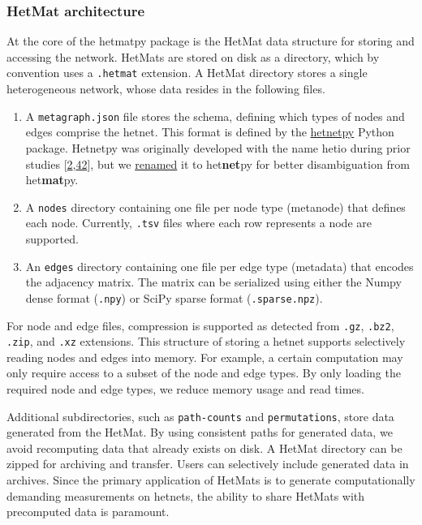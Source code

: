 \hypertarget{hetmat-architecture}{%
\subsubsection{HetMat architecture}\label{hetmat-architecture}}

At the core of the hetmatpy package is the HetMat data structure for storing and accessing the network.
HetMats are stored on disk as a directory, which by convention uses a \texttt{.hetmat} extension.
A HetMat directory stores a single heterogeneous network, whose data resides in the following files.

\begin{enumerate}
\def\labelenumi{\arabic{enumi}.}
\tightlist
\item
  A \texttt{metagraph.json} file stores the schema, defining which types of nodes and edges comprise the hetnet.
  This format is defined by the \href{https://github.com/hetio/hetnetpy}{hetnetpy} Python package.
  Hetnetpy was originally developed with the name hetio during prior studies
  {[}\protect\hyperlink{ref-O21tn8vf}{2},\protect\hyperlink{ref-WkPlH1ds}{42}{]},
  but we \href{https://github.com/hetio/hetnetpy/issues/40}{renamed} it to het\textbf{net}py for better disambiguation from het\textbf{mat}py.
\item
  A \texttt{nodes} directory containing one file per node type (metanode) that defines each node.
  Currently, \texttt{.tsv} files where each row represents a node are supported.
\item
  An \texttt{edges} directory containing one file per edge type (metadata) that encodes the adjacency matrix.
  The matrix can be serialized using either the Numpy dense format (\texttt{.npy}) or SciPy sparse format (\texttt{.sparse.npz}).
\end{enumerate}

For node and edge files, compression is supported as detected from \texttt{.gz}, \texttt{.bz2}, \texttt{.zip}, and \texttt{.xz} extensions.
This structure of storing a hetnet supports selectively reading nodes and edges into memory.
For example, a certain computation may only require access to a subset of the node and edge types.
By only loading the required node and edge types, we reduce memory usage and read times.

Additional subdirectories, such as \texttt{path-counts} and \texttt{permutations}, store data generated from the HetMat.
By using consistent paths for generated data, we avoid recomputing data that already exists on disk.
A HetMat directory can be zipped for archiving and transfer.
Users can selectively include generated data in archives.
Since the primary application of HetMats is to generate computationally demanding measurements on hetnets, the ability to share HetMats with precomputed data is paramount.

